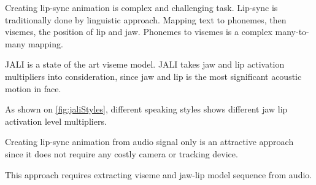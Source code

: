 \documentclass[10pt,twocolumn,letterpaper]{article}
\begin{document}
Creating lip-sync animation is complex and challenging task. Lip-sync is traditionally done by linguistic approach. Mapping text to phonemes, then visemes, the position of lip and jaw\cite{ezzatMikeTalkTalkingFacial1998}. Phonemes to visemes is a complex many-to-many mapping.

JALI\cite{edwardsJALIAnimatorcentricViseme2016} is a state of the art viseme model. JALI takes jaw and lip activation multipliers into consideration, since jaw and lip is the most significant acoustic motion in face.

As shown on \cref{fig:jaliStyles}, different speaking styles shows different jaw lip activation level multipliers.

Creating lip-sync animation from audio signal only is an attractive approach since it does not require any costly camera or tracking device. 

This approach requires extracting viseme and jaw-lip model sequence from audio. 









{\small



}
\end{document}
